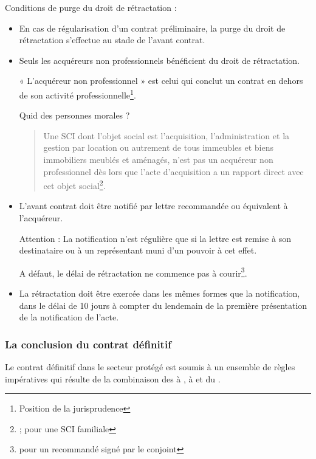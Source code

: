 				\bigskip Conditions de purge du droit de rétractation :
				\begin{itemize}
					\item En cas de régularisation d’un contrat préliminaire, la purge du droit de rétractation s’effectue au stade de l’avant contrat.

					\item Seuls les acquéreurs non professionnels bénéficient du droit de rétractation.

						« L'acquéreur non professionnel » est celui qui conclut un contrat en dehors de son activité professionnelle\footnote{Position de la jurisprudence}.

						Quid des personnes morales ?
						\begin{quote}
							Une SCI dont l'objet social est l'acquisition, l'administration et la gestion par location ou autrement de tous immeubles et biens immobiliers meublés et aménagés, n’est pas un acquéreur non professionnel dès lors que l'acte d’acquisition a un rapport direct avec cet objet social\footnote{  ;  pour une SCI familiale}.
						\end{quote}

					\item L’avant contrat doit être notifié par lettre recommandée ou équivalent à l’acquéreur.

					Attention : La notification n’est régulière que si la lettre est remise à son destinataire ou à un représentant muni d’un pouvoir à cet effet.

					A défaut, le délai de rétractation ne commence pas à courir\footnote{ pour un recommandé signé par le conjoint}.

					\item La rétractation doit être exercée dans les mêmes formes que la notification, dans le délai de 10 jours à compter du lendemain de la première présentation de la notification de l’acte.
				\end{itemize}


		\subsubsection{La conclusion du contrat définitif}


			Le contrat définitif dans le secteur protégé est soumis à un ensemble de règles impératives qui résulte de la combinaison des  à ,  à  et  du \cch.

